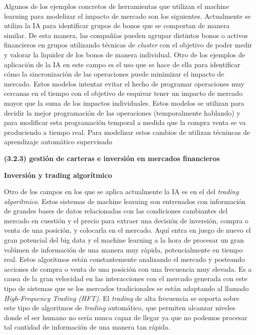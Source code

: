 \documentclass[]{article}
\begin{document}
Algunos de los ejemplos concretos de herramientas que utilizan el
machine learning para modelizar el impacto de mercado son los
siguientes. Actualmente se utiliza la IA para identificar grupos de
bonos que se comportan de manera similar. De esta manera, las compañías
pueden agrupar distintos bonos o activos financieros en grupos
utilizando técnicas de \emph{cluster} con el objetivo de poder medir y
valorar la liquidez de los bonos de manera individual. Otro de los
ejemplos de aplicación de la IA en este campo es el uso que se hace de
ella para identificar cómo la sincronización de las operaciones puede
minimizar el impacto de mercado. Estos modelos intentar evitar el hecho
de programar operaciones muy cercanas en el tiempo con el objetivo de
esquivar tener un impacto de mercado mayor que la suma de los impactos
individuales. Estos modelos se utilizan para decidir la mejor
programación de las operaciones (temporalmente hablando) y para
modificar esta programación temporal a medida que la compra venta se va
produciendo a tiempo real. Para modelizar estos cambios de utilizan
técnincas de aprendizaje automático supervisado

\textbf{(3.2.3) gestión de carteras e inversión en mercados financieros}

\textbf{Inversión y trading algorítmico}

Otro de los campos en los que se aplica actualmente la IA es en el del
\emph{trading algorítmico}. Estos sistemas de machine learning son
entrenados con información de grandes bases de datos relacionadas con
las condiciones cambiantes del mercado en cuestión y el precio para
extraer una decisión de inversión, compra o venta de una posición, y
colocarla en el mercado. Aquí entra en juego de nuevo el gran potencial
del big data y el machine learning a la hora de procesar un gran volúmen
de información de una manera muy rápida, potencialmente en tiempo real.
Estos algoritmos están constantemente analizando el mercado y posteando
acciones de compra o venta de una posición con una frecuencia muy
elevada. Es a causa de la gran velocidad en las interacciones con el
mercado generada con este tipo de sistemas que se los mercados
tradicionales se están adaptando al llamado \emph{High-Frequency Trading
(HFT)}. El \emph{trading} de alta frecuencia se soporta sobre este tipo
de algoritmos de \emph{trading} automático, que permiten alcanzar
niveles donde el ser humano no sería nunca capaz de llegar ya que no
podemos procesar tal cantidad de información de una manera tan rápida.

\setlength\parskip{5ex}
\end{document}
